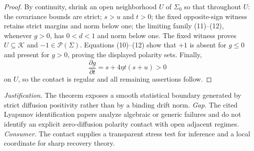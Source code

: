\documentclass{article}
\begin{document}
\begin{proof}
By continuity, shrink an open neighborhood \(U\) of \(\Sigma_0\) so that throughout \(U\): the covariance bounds are strict; \(s>u\) and \(t>0\); the fixed opposite-sign witness retains strict margins and norm below one; the limiting family (11)--(12), whenever \(g>0\), has \(0<d<1\) and norm below one.  The fixed witness proves \(U\subseteq\mathcal K\) and \(-1\in\mathcal P(\Sigma)\).  Equations (10)--(12) show that \(+1\) is absent for \(g\le0\) and present for \(g>0\), proving the displayed polarity sets.  Finally,
\[
 \frac{\partial g}{\partial t}=s+4\eta t(s+u)>0
\]
on \(U\), so the contact is regular and all remaining assertions follow.
\end{proof}
\par\smallskip\noindent \textit{Justification.} The theorem exposes a smooth statistical boundary generated by strict diffusion positivity rather than by a binding drift norm. \textit{Gap.} The cited Lyapunov identification papers analyze algebraic or generic failures and do not identify an explicit zero-diffusion polarity contact with open adjacent regimes. \textit{Consumer.} The contact supplies a transparent stress test for inference and a local coordinate for sharp recovery theory.
\end{document}

